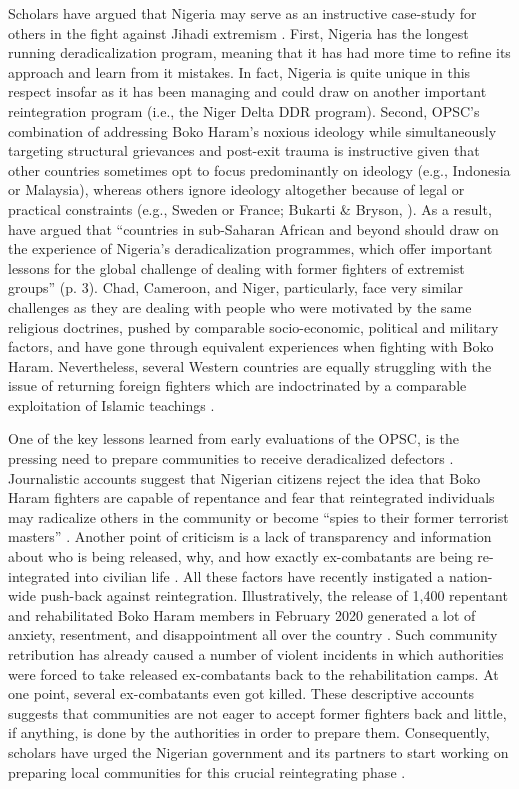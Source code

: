 Scholars have argued that Nigeria may serve as an instructive case-study for others in the fight against Jihadi extremism \citep{Bukarti2019}. First, Nigeria has the longest running deradicalization program, meaning that it has had more time to refine its approach and learn from it mistakes. In fact, Nigeria is quite unique in this respect insofar as it has been managing and could draw on another important reintegration program (i.e., the Niger Delta DDR program). Second, OPSC's combination of addressing Boko Haram's noxious ideology while simultaneously targeting structural grievances and post-exit trauma is instructive given that other countries sometimes opt to focus predominantly on ideology (e.g., Indonesia or Malaysia), whereas others ignore ideology altogether because of legal or practical constraints (e.g., Sweden or France; Bukarti \& Bryson, \citeyear{Bukarti2019}). As a result, \cite{Bukarti2019} have argued that ``countries in sub-Saharan African and beyond should draw on the experience of Nigeria's deradicalization programmes, which offer important lessons for the global challenge of dealing with former fighters of extremist groups'' (p. 3). Chad, Cameroon, and Niger, particularly, face very similar challenges as they are dealing with people who were motivated by the same religious doctrines, pushed by comparable socio-economic, political and military factors, and have gone through equivalent experiences when fighting with Boko Haram. Nevertheless, several Western countries are equally struggling with the issue of returning foreign fighters which are indoctrinated by a comparable exploitation of Islamic teachings \citep{Bukarti2019}.


One of the key lessons learned from early evaluations of the OPSC, is the pressing need to prepare communities to receive deradicalized defectors \citep{Bukarti2019}. Journalistic accounts suggest that Nigerian citizens reject the idea that Boko Haram fighters are capable of repentance \citep{Linetsky2016} and fear that reintegrated individuals may radicalize others in the community or become ``spies to their former terrorist masters'' \citep{Adibe2020}. Another point of criticism is a lack of transparency and information about who is being released, why, and how exactly ex-combatants are being re-integrated into civilian life \citep{Brechenmacher2018, Adibe2020}. All these factors have recently instigated a nation-wide push-back against reintegration. Illustratively, the release of 1,400 repentant and rehabilitated Boko Haram members in February 2020 generated a lot of anxiety, resentment, and disappointment all over the country \citep{Kamasah2020}. Such community retribution has already caused a number of violent incidents in which authorities were forced to take released ex-combatants back to the rehabilitation camps. At one point, several ex-combatants even got killed. These descriptive accounts suggests that communities are not eager to accept former fighters back and little, if anything, is done by the authorities in order to prepare them. Consequently, scholars have urged the Nigerian government and its partners to start working on preparing local communities for this crucial reintegrating phase \citep{Adibe2020, Bukarti2019}. 


